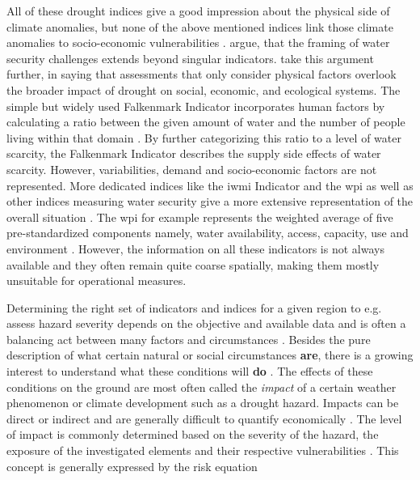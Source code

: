 All of these drought indices give a good impression about the physical side of climate anomalies, but none of the above mentioned indices link those climate anomalies to socio-economic vulnerabilities \autocite{enenkelWhyPredictClimate2020}. \Textcite{mishraWaterSecurityChanging2021} argue, that the framing of water security challenges extends beyond singular indicators. \Textcite{lackstromBackyardHydroclimatologyCitizen2022} take this argument further, in saying that assessments that only consider physical factors overlook the broader impact of drought on social, economic, and ecological systems.\newline
The simple but widely used Falkenmark Indicator incorporates human factors by calculating a ratio between the given amount of water and the number of people living within that domain \autocite{falkenmarkMacroscaleWaterScarcity1989}. By further categorizing this ratio to a level of water scarcity, the Falkenmark Indicator describes the supply side effects of water scarcity. However, variabilities, demand and socio-economic factors are not represented.\newline 
More dedicated indices like the \acrfull{iwmi} Indicator and the \acrfull{wpi} as well as other indices measuring water security give a more extensive representation of the overall situation \autocite{arreguin-cortesMunicipalLevelWater2019,liuWaterScarcityAssessments2017}. The \acrshort{wpi} for example represents the weighted average of five pre-standardized components namely, water availability, access, capacity, use and environment \autocite{sullivanWaterPovertyIndex2003}. However, the information on all these indicators is not always available and they often remain quite coarse spatially, making them mostly unsuitable for operational measures.

Determining the right set of indicators and indices for a given region to e.g. assess hazard severity depends on the objective and available data and is often a balancing act between many factors and circumstances \autocite{svobodaHandbookDroughtIndicators2016}. Besides the pure description of what certain natural or social circumstances \textbf{are}, there is a growing interest to understand what these conditions will \textbf{do} \autocite{boultDroughtImpactbasedForecasting2022, lackstromBackyardHydroclimatologyCitizen2022}.\newline
The effects of these conditions on the ground are most often called the \textit{impact} of a certain weather phenomenon or climate development such as a drought hazard. Impacts can be direct or indirect and are generally difficult to quantify economically \autocite{undrrSpecialReportDrought2021}. The level of impact is commonly determined based on the severity of the hazard, the exposure of the investigated elements and their respective vulnerabilities \autocite{harrowsmithFutureForecastImpact2020,svobodaHandbookDroughtIndicators2016,undrrSpecialReportDrought2021}.
This concept is generally expressed by the risk equation

